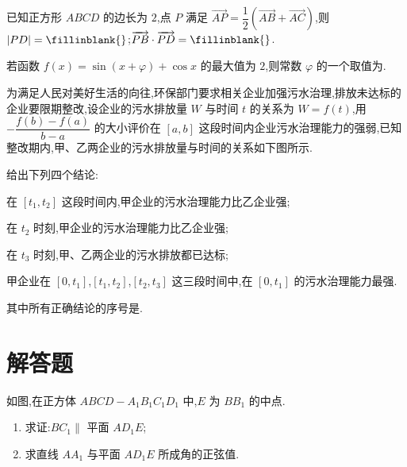 \begin{problem}
已知正方形 \(ABCD\) 的边长为 \(2\),点 \(P\) 满足 \(\overrightarrow{AP}=\dfrac12\left(\overrightarrow{AB}+\overrightarrow{AC}\right)\),则 \(|PD|=\fillinblank{}\);\(\overrightarrow{PB}\cdot\overrightarrow{PD}=\fillinblank{}\).
\end{problem}

\begin{problem}
若函数 \(f(x)=\sin(x+\varphi)+\cos x\) 的最大值为 \(2\),则常数 \(\varphi\) 的一个取值为\fillinblank{}.
\end{problem}

\begin{problem}
为满足人民对美好生活的向往,环保部门要求相关企业加强污水治理,排放未达标的企业要限期整改,设企业的污水排放量 \(W\) 与时间 \(t\) 的关系为 \(W=f(t)\),用 \(-\dfrac{f(b)-f(a)}{b-a}\) 的大小评价在 \([a,b]\) 这段时间内企业污水治理能力的强弱,已知整改期内,甲、乙两企业的污水排放量与时间的关系如下图所示.

给出下列四个结论:

\begin{circlelist}
\item 在 \([t_1,t_2]\) 这段时间内,甲企业的污水治理能力比乙企业强;

\item 在 \(t_2\) 时刻,甲企业的污水治理能力比乙企业强;

\item 在 \(t_3\) 时刻,甲、乙两企业的污水排放都已达标;

\item 甲企业在 \([0,t_1]\),\([t_1,t_2]\),\([t_2,t_3]\) 这三段时间中,在 \([0,t_1]\) 的污水治理能力最强.
\end{circlelist}
其中所有正确结论的序号是\fillinblank{}.

\begin{center}
\end{center}
\end{problem}

\section{解答题}

\begin{problem}
如图,在正方体 \(ABCD-A_1B_1C_1D_1\) 中,\(E\) 为 \(BB_1\) 的中点.

\begin{enumerate}
    \item 求证:\(BC_1\parallel\) 平面 \(AD_1E\);
    \item 求直线 \(AA_1\) 与平面 \(AD_1E\) 所成角的正弦值.
\end{enumerate}

\begin{center}
\end{center}
\end{problem}


